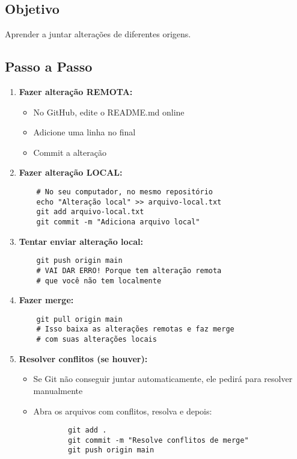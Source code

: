 \subsection{Objetivo}
Aprender a juntar alterações de diferentes origens.

\subsection{Passo a Passo}
\begin{enumerate}
    \item \textbf{Fazer alteração REMOTA:}
    \begin{itemize}
        \item No GitHub, edite o README.md online
        \item Adicione uma linha no final
        \item Commit a alteração
    \end{itemize}
    
    \item \textbf{Fazer alteração LOCAL:}
    \begin{verbatim}
    # No seu computador, no mesmo repositório
    echo "Alteração local" >> arquivo-local.txt
    git add arquivo-local.txt
    git commit -m "Adiciona arquivo local"
    \end{verbatim}
    
    \item \textbf{Tentar enviar alteração local:}
    \begin{verbatim}
    git push origin main
    # VAI DAR ERRO! Porque tem alteração remota 
    # que você não tem localmente
    \end{verbatim}
    
    \item \textbf{Fazer merge:}
    \begin{verbatim}
    git pull origin main
    # Isso baixa as alterações remotas e faz merge 
    # com suas alterações locais
    \end{verbatim}
    
    \item \textbf{Resolver conflitos (se houver):}
    \begin{itemize}
        \item Se Git não conseguir juntar automaticamente, ele pedirá para resolver manualmente
        \item Abra os arquivos com conflitos, resolva e depois:
        \begin{verbatim}
        git add .
        git commit -m "Resolve conflitos de merge"
        git push origin main
        \end{verbatim}
    \end{itemize}
\end{enumerate}

